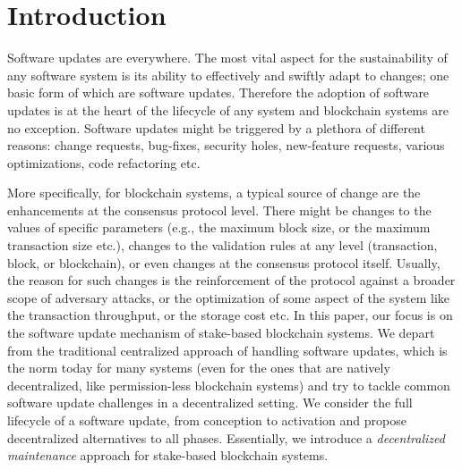 \section{Introduction}
Software updates are everywhere. The most vital aspect for the sustainability of any software system is its ability to effectively and swiftly adapt to changes; one basic form of which are software updates. Therefore the adoption of software updates is at the heart of the lifecycle of any system and blockchain systems are no exception. Software updates might be triggered by a plethora of different reasons: change requests, bug-fixes, security holes, new-feature requests, various optimizations, code refactoring etc.


More specifically, for blockchain systems, a typical source of change are the enhancements at the consensus protocol level. There might be changes to the values of specific parameters (e.g., the maximum block size, or the maximum transaction size etc.), changes to the validation rules at any level (transaction, block, or blockchain), or even changes at the consensus protocol itself. Usually, the reason for such changes is the reinforcement of the protocol against a broader scope of adversary attacks, or the optimization of some aspect of the system like the transaction throughput, or the storage cost etc.
In this paper, our focus is on the software update mechanism of stake-based blockchain systems. We depart from the traditional centralized approach of handling software updates, which is the norm today for many systems (even for the ones that are natively decentralized, like permission-less blockchain systems) and try to tackle common software update challenges in a decentralized setting. We consider the full lifecycle of a software update, from conception to activation and propose decentralized alternatives to all phases. Essentially, we introduce a \emph{decentralized maintenance} approach for stake-based blockchain systems.

